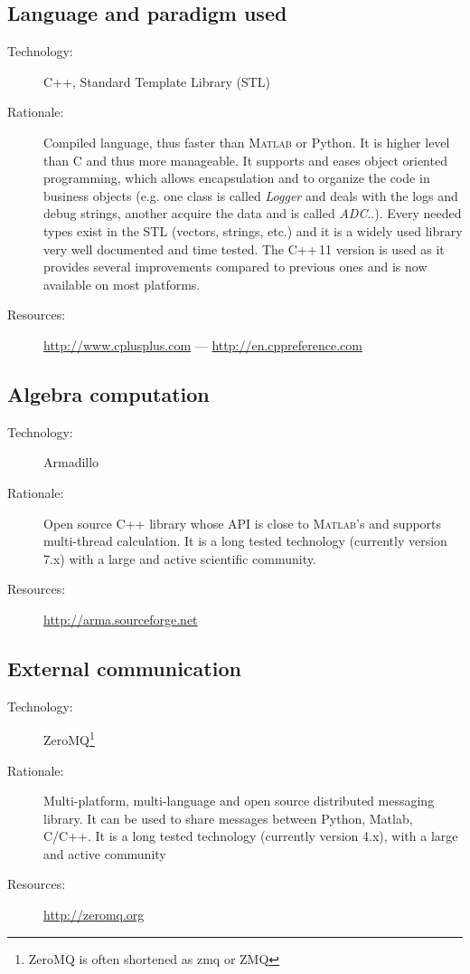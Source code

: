 \subsection{Language and paradigm used}
\begin{description}
    \item[Technology:] C++, Standard Template Library (STL)
    \item[Rationale:] Compiled language, thus faster than \textsc{Matlab} or Python. It is higher level than C and thus more manageable. It supports and eases object oriented programming, which allows encapsulation and to organize the code in business objects (e.g. one class is called \textit{Logger} and deals with the logs and debug strings, another acquire the data and is called \textit{ADC}..). Every needed types exist in the STL (vectors, strings, etc.) and it is a widely used library very well documented and time tested. The C++\,11 version is used as it provides several improvements compared to previous ones and is now available on most platforms.
    \item[Resources:] \url{http://www.cplusplus.com} --- \url{http://en.cppreference.com}
\end{description}

\subsection{Algebra computation}
\begin{description}
    \item[Technology:] Armadillo
    \item[Rationale:] Open source C++ library whose API is close to \textsc{Matlab}'s and supports multi-thread calculation. It is a long tested technology (currently version 7.x) with a large and active scientific community.
    \item[Resources:] \url{http://arma.sourceforge.net}
\end{description}

\subsection{External communication}
\begin{description}
   \item[Technology:] ZeroMQ\footnote{ZeroMQ is often shortened as zmq or ZMQ}
   \item[Rationale:] Multi-platform, multi-language and open source distributed messaging library. It can be used to share messages between Python, Matlab, C/C++. It is a long tested technology (currently version 4.x), with a large and active community
   \item[Resources:] \url{http://zeromq.org}
\end{description}

